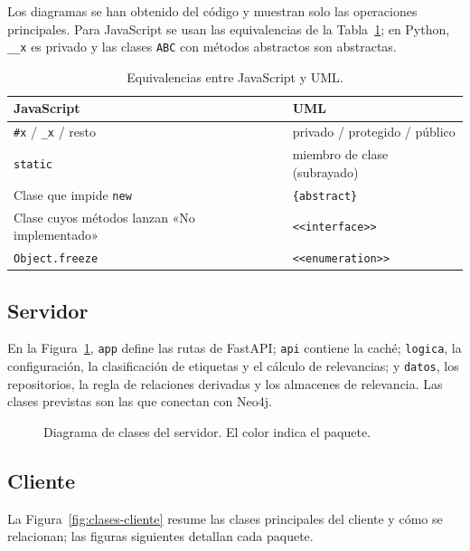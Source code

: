 Los diagramas se han obtenido del código y muestran solo las operaciones principales. Para JavaScript se usan las equivalencias de la Tabla~\ref{tab:equivalencias}; en Python, \texttt{\_\_x} es privado y las clases \texttt{ABC} con métodos abstractos son abstractas.

\begin{table}[htbp]
\centering
\small
\caption{Equivalencias entre JavaScript y UML.}
\label{tab:equivalencias}
\begin{tabular}{|l|l|}
\hline
\textbf{JavaScript} & \textbf{UML} \\ \hline
\texttt{\#x} / \texttt{\_x} / resto & privado / protegido / público \\ \hline
\texttt{static} & miembro de clase (subrayado) \\ \hline
Clase que impide \texttt{new} & \texttt{\{abstract\}} \\ \hline
Clase cuyos métodos lanzan «No implementado» & \texttt{<<interface>>} \\ \hline
\texttt{Object.freeze} & \texttt{<<enumeration>>} \\ \hline
\end{tabular}
\end{table}

\subsection{Servidor}

En la Figura~\ref{fig:clases-servidor}, \texttt{app} define las rutas de FastAPI; \texttt{api} contiene la caché; \texttt{logica}, la configuración, la clasificación de etiquetas y el cálculo de relevancias; y \texttt{datos}, los repositorios, la regla de relaciones derivadas y los almacenes de relevancia. Las clases previstas son las que conectan con Neo4j. 

\begin{figure}
  \centering
  \caption{Diagrama de clases del servidor. El color indica el paquete.}
  \label{fig:clases-servidor}
\end{figure}

\subsection{Cliente}

La Figura~\ref{fig:clases-cliente} resume las clases principales del cliente y cómo se relacionan; las figuras siguientes detallan cada paquete.

